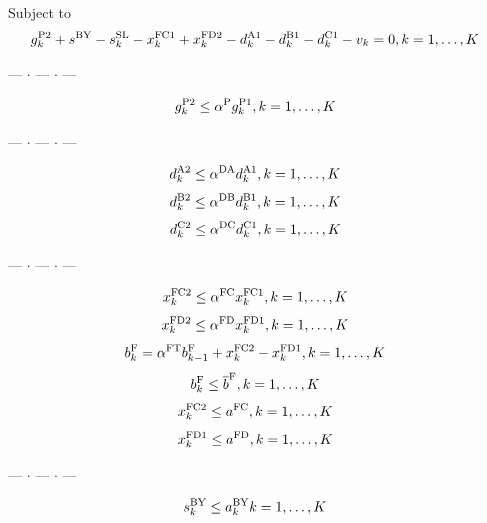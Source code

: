 \documentclass{jarticle}
\begin{document}
\noindent
{\rm Subject to}
%
\begin{equation}
 g^{\rm P2}_{k} + s^{\rm BY} - s^{\rm SL}_{k}
 - x^{\rm FC1}_{k} + x^{\rm FD2}_{k} 
 - d^{\rm A1}_{k} - d^{\rm B1}_{k} - d^{\rm C1}_{k} - v_k = 0,
 \hfill
 k=1,\ldots,K
~~
\end{equation}
%
\begin{center} --- $ \cdot $ --- $ \cdot $ --- \end{center}
%
\begin{equation}
 g^{\rm P2}_{k} \le \alpha^{\rm P} g^{\rm P1}_{k} ,
 \hfill
 k=1,\ldots,K
 ~~
 \label{eq:gP1gP2}
\end{equation}
%
\begin{center} --- $ \cdot $ --- $ \cdot $ --- \end{center}
%
\begin{equation}
 d^{\rm A2}_{k} \le \alpha^{\rm DA} d^{\rm A1}_{k} ,
 \hfill
 k=1,\ldots,K
~~
 \label{eq:dA1A2}
\end{equation}
%
\begin{equation}
 d^{\rm B2}_{k} \le \alpha^{\rm DB} d^{\rm B1}_{k},
 \hfill
 k=1,\ldots,K
~~
 \label{eq:dB1B2}
\end{equation}
%
\begin{equation}
 d^{\rm C2}_{k} \le \alpha^{\rm DC} d^{\rm C1}_{k},
 \hfill
 k=1,\ldots,K
~~
 \label{eq:dC1C2}
\end{equation}
%
\begin{center} --- $ \cdot $ --- $ \cdot $ --- \end{center}
%
\begin{equation}
 x^{\rm FC2}_{k} \le \alpha^{\rm FC}x^{\rm FC1}_{k},
 \hfill
 k=1,\ldots,K
~~
 \label{eq:xFC1FC2}
\end{equation}
%
\begin{equation}
 x^{\rm FD2}_{k} \le \alpha^{\rm FD} x^{\rm FD1}_{k} ,
 \hfill
 k=1,\ldots,K
~~
 \label{eq:FD1FD2}
\end{equation}
%
\begin{equation}
 b^{\rm F}_{k} = \alpha^{\rm FT} b^{\rm F}_{k-1} + x^{\rm FC2}_{k} - x^{\rm FD1}_{k},
 \hfill
 k=1,\ldots,K
~~
\end{equation}
%
\begin{equation}
 b^{\rm F}_{k} \le \overline{b}^{\rm F},
 \hfill
 k=1,\ldots,K
~~
\end{equation}
%
\begin{equation}
 x^{\rm FC2}_{k} \le a^{\rm FC},
 \hfill
 k=1,\ldots,K
~~
\end{equation}
%
\begin{equation}
 x^{\rm FD1}_{k} \le a^{\rm FD},
 \hfill
 k=1,\ldots,K
~~
\end{equation}
%
\begin{center} --- $ \cdot $ --- $ \cdot $ --- \end{center}
%
\begin{equation}
 s^{\rm BY}_{k} \le  a^{\rm BY}_{k}
 \hfill
 k=1,\ldots,K
~~
 \label{eq:sMax}
\end{equation}
\end{document}
